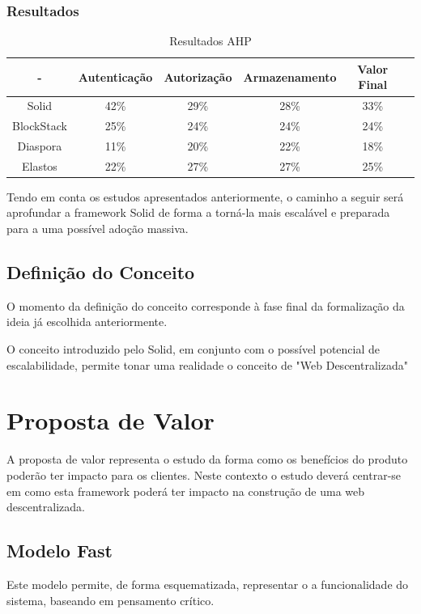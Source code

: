 \subsubsection{Resultados}

\begin{table}[h]
\centering
\caption{Resultados AHP}
\vspace{0.5cm}
\begin{tabular}{c|c|c|c|c|c} 
 - & Autenticação & Autorização & Armazenamento & Valor Final & \\
\hline                               
Solid & 42\% &	29\% & 28\%	& 33\% & \\
BlockStack &  25\% & 24\% & 24\% & 24\% & \\
Diaspora &  11\% &	20\% & 22\% & 18\% & \\
Elastos & 22\% & 27\% & 27\% & 25\% & \\
\end{tabular}
\end{table}


Tendo em conta os estudos apresentados anteriormente, o caminho a seguir será aprofundar a framework Solid de forma a torná-la mais escalável e preparada para a uma possível adoção massiva.

\subsection{Definição do Conceito}
O momento da definição do conceito corresponde à fase final da formalização da ideia já escolhida anteriormente.

O conceito introduzido pelo Solid, em conjunto com o possível potencial de escalabilidade, permite tonar uma realidade o conceito de "Web Descentralizada"

\section{Proposta de Valor}
A proposta de valor representa o estudo da forma como os benefícios do produto poderão ter impacto para os clientes. Neste contexto o estudo deverá centrar-se em como esta framework poderá ter impacto na construção de uma web descentralizada.

\subsection{Modelo Fast}
Este modelo permite, de forma esquematizada, representar o a funcionalidade do sistema, baseando em pensamento crítico.

